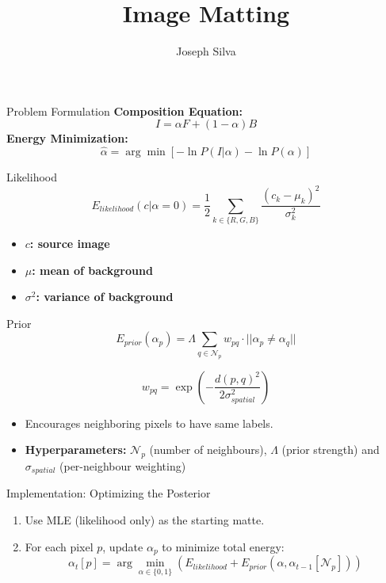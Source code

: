 \documentclass{beamer}
\title[MAP Matting]{Image Matting}
\author{Joseph Silva}
\institute[TCD]{Trinity College Dublin \\ \medskip \textit{silvajo@tcd.ie}}
\date{}
\begin{document}
\begin{frame}
    \titlepage
\end{frame}

\begin{frame}{Problem Formulation}
    \textbf{Composition Equation:}
    \[ I = \alpha F + (1-\alpha)B \]
    \vfill
    \textbf{Energy Minimization:}
    \[ \hat{\alpha} = \arg\min [-\ln P(I | \alpha) - \ln P(\alpha)] \]
\end{frame}

\begin{frame}{Likelihood}
    \[ E_{likelihood}(c | \alpha=0) = \frac{1}{2} \sum_{k \in \{R,G,B\}} \frac{(c_k - \mu_k)^2}{\sigma_k^2} \]
    
    \begin{itemize}
        \item \textbf{$c$: source image}
        \item \textbf{$\mu$: mean of background}
        \item \textbf{$\sigma^2$: variance of background}
    \end{itemize}
\end{frame}

\begin{frame}{Prior}
    \[ E_{prior}(\alpha_p) = \Lambda \sum_{q \in \mathcal{N}_p} w_{pq} \cdot ||\alpha_p \neq \alpha_q|| \]
    
    \[ w_{pq} = \exp\left( - \frac{d(p,q)^2}{2\sigma_{spatial}^2} \right) \]
    
    \begin{itemize}
        \item Encourages neighboring pixels to have same labels.
        \item \textbf{Hyperparameters:} $\mathcal{N}_p$ (number of neighbours), $\Lambda$ (prior strength) and $\sigma_{spatial}$ (per-neighbour weighting)
    \end{itemize}
\end{frame}

\begin{frame}{Implementation: Optimizing the Posterior}
    \begin{enumerate}
        \item Use MLE (likelihood only) as the starting matte.
        \item For each pixel $p$, update $\alpha_p$ to minimize total energy:
        \[ \alpha_t[p] = \arg\min_{\alpha \in \{0,1\}} (E_{likelihood} + E_{prior}(\alpha, \alpha_{t-1}[\mathcal{N}_p])) \]
    \end{enumerate}
    \vfill
    \centering
\end{frame}
\end{document}
